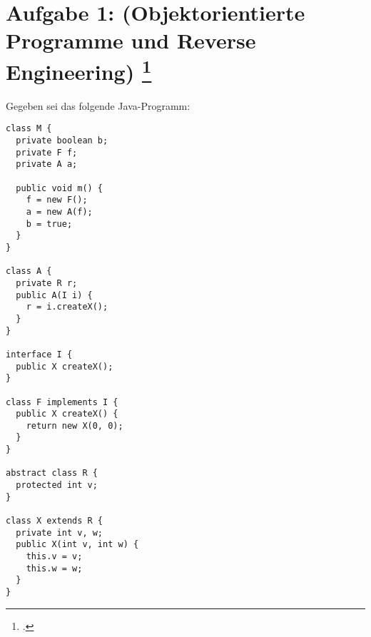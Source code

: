 \documentclass{lehramt-informatik-minimal}
\begin{document}
\section{Aufgabe 1: (Objektorientierte Programme und Reverse Engineering)
\footcite[Seite 15-16]{examen:66116:2018:03}}

Gegeben sei das folgende Java-Programm:

\begin{verbatim}
class M {
  private boolean b;
  private F f;
  private A a;

  public void m() {
    f = new F();
    a = new A(f);
    b = true;
  }
}

class A {
  private R r;
  public A(I i) {
    r = i.createX();
  }
}

interface I {
  public X createX();
}

class F implements I {
  public X createX() {
    return new X(0, 0);
  }
}

abstract class R {
  protected int v;
}

class X extends R {
  private int v, w;
  public X(int v, int w) {
    this.v = v;
    this.w = w;
  }
}
\end{verbatim}
\end{document}

